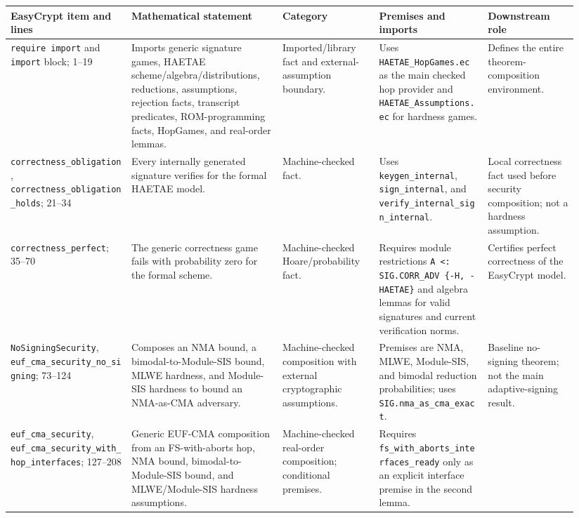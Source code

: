 \documentclass[11pt]{report}
\DeclareRobustCommand{\file}[1]{\ifmmode\text{\nolinkurl{#1}}\else\nolinkurl{#1}\fi}
\DeclareRobustCommand{\ec}[1]{\ifmmode\text{\nolinkurl{#1}}\else\nolinkurl{#1}\fi}
\theoremstyle{definition}
\theoremstyle{plain}
\begin{document}
{\footnotesize
\begin{longtable}{p{0.20\linewidth}p{0.25\linewidth}p{0.16\linewidth}p{0.18\linewidth}p{0.15\linewidth}}
\toprule
\textbf{EasyCrypt item and lines} & \textbf{Mathematical statement} &
\textbf{Category} & \textbf{Premises and imports} & \textbf{Downstream role} \\
\midrule
\ec{require import} and \ec{import} block; 1--19 &
Imports generic signature games, HAETAE scheme/algebra/distributions,
reductions, assumptions, rejection facts, transcript predicates,
ROM-programming facts, HopGames, and real-order lemmas. &
Imported/library fact and external-assumption boundary. &
Uses \file{HAETAE\_HopGames.ec} as the main checked hop provider and
\file{HAETAE\_Assumptions.ec} for hardness games. &
Defines the entire theorem-composition environment. \\
\midrule
\ec{correctness\_obligation},
\ec{correctness\_obligation\_holds}; 21--34 &
Every internally generated signature verifies for the formal HAETAE model. &
Machine-checked fact. &
Uses \ec{keygen\_internal}, \ec{sign\_internal}, and
\ec{verify\_internal\_sign\_internal}. &
Local correctness fact used before security composition; not a hardness
assumption. \\
\midrule
\ec{correctness\_perfect}; 35--70 &
The generic correctness game fails with probability zero for the formal scheme. &
Machine-checked Hoare/probability fact. &
Requires module restrictions \ec{A <: SIG.CORR\_ADV \{-H, -HAETAE\}} and
algebra lemmas for valid signatures and current verification norms. &
Certifies perfect correctness of the EasyCrypt model. \\
\midrule
\ec{NoSigningSecurity}, \ec{euf\_cma\_security\_no\_signing}; 73--124 &
Composes an NMA bound, a bimodal-to-Module-SIS bound, MLWE hardness, and
Module-SIS hardness to bound an NMA-as-CMA adversary. &
Machine-checked composition with external cryptographic assumptions. &
Premises are NMA, MLWE, Module-SIS, and bimodal reduction probabilities; uses
\ec{SIG.nma\_as\_cma\_exact}. &
Baseline no-signing theorem; not the main adaptive-signing result. \\
\midrule
\ec{euf\_cma\_security},
\ec{euf\_cma\_security\_with\_hop\_interfaces}; 127--208 &
Generic EUF-CMA composition from an FS-with-aborts hop, NMA bound,
bimodal-to-Module-SIS bound, and MLWE/Module-SIS hardness assumptions. &
Machine-checked real-order composition; conditional premises. &
Requires \ec{fs\_with\_aborts\_interfaces\_ready} only as an explicit interface
premise in the second lemma. &

\end{longtable}}
\end{document}
